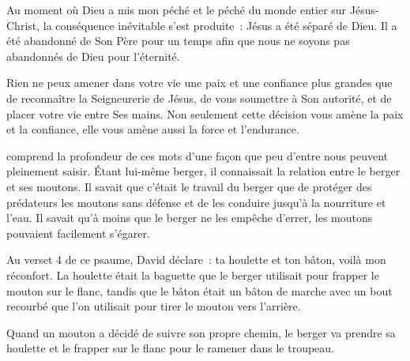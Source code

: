
Au moment où Dieu a mis mon péché \ocadr{}et le péché du monde entier\fcadr{}
 sur Jésus-Christ, la conséquence inévitable s'est produite~:
 Jésus a été séparé de Dieu. Il a été abandonné de Son Père
 pour un temps afin que nous ne soyons pas abandonnés de Dieu pour l'éternité.

Rien ne peux amener dans votre vie une paix et une confiance plus grandes
 que de reconnaître la Seigneurerie de Jésus, de vous soumettre à Son autorité,
 et de placer votre vie entre Ses mains.
 Non seulement cette décision vous amène la paix et la confiance,
 elle vous amène aussi la force et l'endurance.

\dvrule






 comprend la profondeur de ces mots
 d'une façon que peu d'entre nous peuvent pleinement saisir.
 Étant lui-même berger, il connaissait la relation entre le berger
 et ses moutons.
 Il savait que c'était le travail du berger que de protéger
 des prédateurs les moutons sans défense et de les conduire
 jusqu'à la nourriture et l'eau.
 Il savait qu'à moins que le berger ne les empêche d'errer,
 les moutons pouvaient facilement s'égarer.

Au verset 4 de ce psaume, David déclare~:
 \og ta houlette et ton bâton, voilà mon réconfort. \fg{}
 La houlette était la baguette que le berger utilisait
 pour frapper le mouton sur le flanc, tandis que le bâton
 était un bâton de marche avec un bout recourbé
 que l'on utilisait pour tirer le mouton vers l'arrière.


Quand un mouton a décidé de suivre son propre chemin,
 le berger va prendre sa houlette et le frapper
 sur le flanc pour le ramener dans le troupeau.

